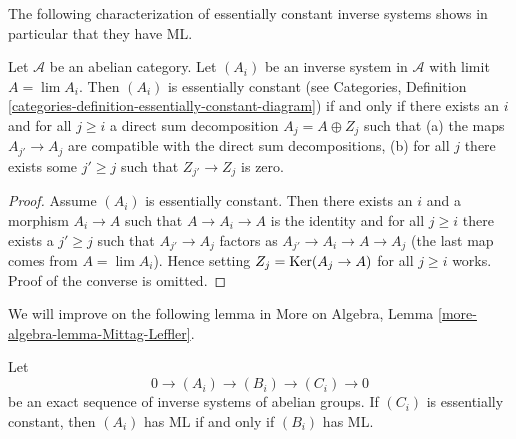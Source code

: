 \noindent
The following characterization of essentially constant inverse systems
shows in particular that they have ML.

\begin{lemma}
\label{lemma-essentially-constant}
Let $\mathcal{A}$ be an abelian category.
Let $(A_i)$ be an inverse system in $\mathcal{A}$ with limit $A = \lim A_i$.
Then $(A_i)$ is essentially constant (see
Categories, Definition
\ref{categories-definition-essentially-constant-diagram})
if and only if there exists an $i$ and for all $j \geq i$ a direct sum
decomposition $A_j = A \oplus Z_j$ such that
(a) the maps $A_{j'} \to A_j$ are compatible with the direct sum
decompositions, (b) for all $j$ there exists some $j' \geq j$ such that
$Z_{j'} \to Z_j$ is zero.
\end{lemma}

\begin{proof}
Assume $(A_i)$ is essentially constant. Then there exists an $i$ and
a morphism $A_i \to A$ such that $A \to A_i \to A$ is the identity and
for all $j \geq i$ there exists
a $j' \geq j$ such that $A_{j'} \to A_j$ factors as
$A_{j'} \to A_i \to A \to A_j$ (the last map comes from $A = \lim A_i$).
Hence setting $Z_j = \mathop{\mathrm{Ker}}(A_j \to A)$ for all $j \geq i$ works.
Proof of the converse is omitted.
\end{proof}

\noindent
We will improve on the following lemma in
More on Algebra, Lemma \ref{more-algebra-lemma-Mittag-Leffler}.

\begin{lemma}
\label{lemma-exact-sequence-ML}
Let
$$
0 \to (A_i) \to (B_i) \to (C_i) \to 0
$$
be an exact sequence of inverse systems of abelian groups.
If $(C_i)$ is essentially constant, then $(A_i)$ has ML
if and only if $(B_i)$ has ML.
\end{lemma}


